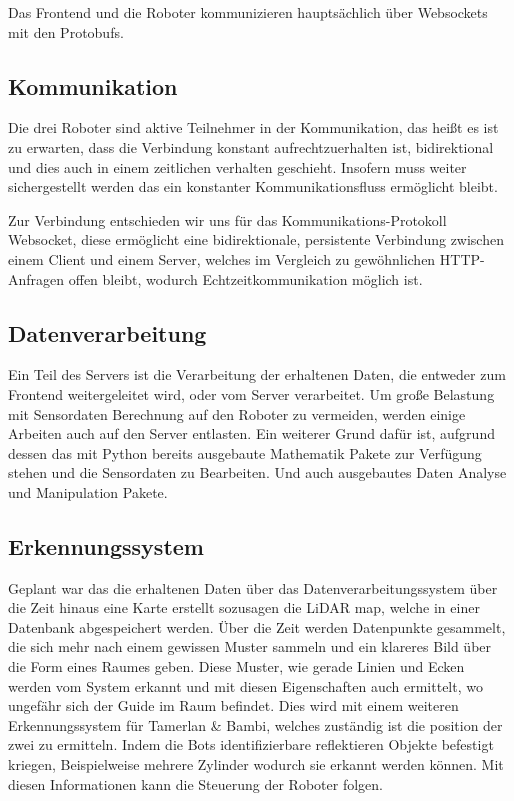 Das Frontend und die Roboter kommunizieren hauptsächlich 
über Websockets mit den Protobufs.

\subsection{Kommunikation}
\label{subsec:Kommunikation}
Die drei Roboter sind aktive Teilnehmer in der Kommunikation, 
das heißt es ist zu erwarten, dass die Verbindung konstant aufrechtzuerhalten ist,
bidirektional und dies auch in einem zeitlichen verhalten geschieht. 
Insofern muss weiter sichergestellt werden das ein konstanter Kommunikationsfluss 
ermöglicht bleibt.

Zur Verbindung entschieden wir uns für das Kommunikations-Protokoll Websocket, 
diese ermöglicht eine bidirektionale, 
persistente Verbindung zwischen einem Client und einem Server,
welches im Vergleich zu gewöhnlichen HTTP-Anfragen offen bleibt, 
wodurch Echtzeitkommunikation möglich ist.

\subsection{Datenverarbeitung}
Ein Teil des Servers ist die Verarbeitung der erhaltenen Daten, 
die entweder zum Frontend weitergeleitet wird, oder vom Server verarbeitet.
% 
Um große Belastung mit Sensordaten Berechnung auf den Roboter zu vermeiden,
werden einige Arbeiten auch auf den Server entlasten.
Ein weiterer Grund dafür ist, aufgrund dessen das mit Python 
bereits ausgebaute Mathematik Pakete zur Verfügung stehen
und die Sensordaten zu Bearbeiten.
Und auch ausgebautes Daten Analyse und Manipulation Pakete.


\subsection{Erkennungssystem}
Geplant war das die erhaltenen Daten über das Datenverarbeitungssystem 
über die Zeit hinaus eine Karte erstellt sozusagen die LiDAR map,
welche in einer Datenbank abgespeichert werden.
% 
Über die Zeit werden Datenpunkte gesammelt, 
die sich mehr nach einem gewissen Muster sammeln 
und ein klareres Bild über die Form eines Raumes geben.
Diese Muster, wie gerade Linien und Ecken werden vom System erkannt
und mit diesen Eigenschaften auch ermittelt, 
wo ungefähr sich der Guide im Raum befindet.
% 
Dies wird mit einem weiteren Erkennungssystem für Tamerlan \& Bambi,
welches zuständig ist die position der zwei zu ermitteln.
Indem die Bots identifizierbare reflektieren Objekte befestigt kriegen,
Beispielweise mehrere Zylinder wodurch sie erkannt werden können.
%
Mit diesen Informationen kann die Steuerung der Roboter folgen.

